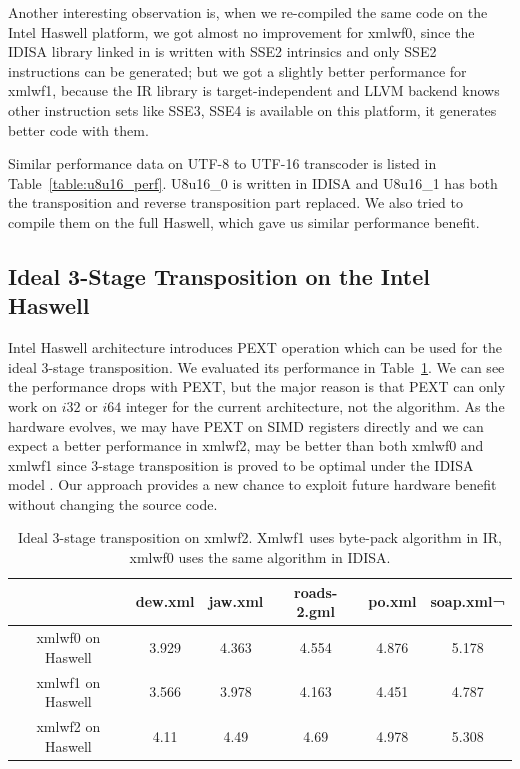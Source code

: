 Another interesting observation is, when we re-compiled the same code on the Intel Haswell platform, we got almost no improvement for xmlwf0, since the IDISA library linked in is written with SSE2 intrinsics and only SSE2 instructions can be generated; but we got a slightly better performance for xmlwf1, because the IR library is target-independent and LLVM backend knows other instruction sets like SSE3, SSE4 is available on this platform, it generates better code with them.

Similar performance data on UTF-8 to UTF-16 transcoder is listed in Table~\ref{table:u8u16_perf}. U8u16\_0 is written in IDISA and U8u16\_1 has both the transposition and reverse transposition part replaced. We also tried to compile them on the full Haswell, which gave us similar performance benefit.

\subsection{Ideal 3-Stage Transposition on the Intel Haswell}
Intel Haswell architecture introduces PEXT operation which can be used for the ideal 3-stage transposition. We evaluated its performance in Table~\ref{table:PEXT_transposition}. We can see the performance drops with PEXT, but the major reason is that PEXT can only work on $i32$ or $i64$ integer for the current architecture, not the algorithm. As the hardware evolves, we may have PEXT on SIMD registers directly and we can expect a better performance in xmlwf2, may be better than both xmlwf0 and xmlwf1 since 3-stage transposition is proved to be optimal under the IDISA model \cite{inductive_doubling_principle}. Our approach provides a new chance to exploit future hardware benefit without changing the source code.

\begin{table}[h]
\centering
\begin{tabular}{|c|c|c|c|c|c|}
\hline
        & dew.xml  &  jaw.xml  &  roads-2.gml  &  po.xml  & soap.xml¬ \\\hline
xmlwf0 on Haswell   &  3.929   &   4.363   &   4.554   &   4.876   &   5.178 \\ \hline
xmlwf1 on Haswell &   3.566   &   3.978   &   4.163   &   4.451   &   4.787 \\ \hline
xmlwf2 on Haswell & 4.11   &    4.49   &    4.69   &    4.978   &   5.308 \\ \hline
\end{tabular}
\caption[Ideal 3-Stage Transposition with PEXT]{Ideal 3-stage transposition on xmlwf2. Xmlwf1 uses byte-pack algorithm in IR, xmlwf0 uses the same algorithm in IDISA.}
\label{table:PEXT_transposition}
\end{table}

